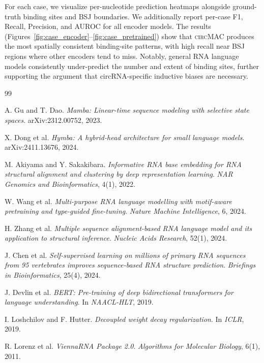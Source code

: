 \documentclass[11pt]{article}
\newcommand{\model}{\textsc{circMAC}}
\begin{document}
For each case, we visualize per-nucleotide prediction heatmaps alongside
ground-truth binding sites and BSJ boundaries.
We additionally report per-case F1, Recall, Precision, and AUROC for all
encoder models.
The results (Figures~\ref{fig:case_encoder}--\ref{fig:case_pretrained})
show that \model{} produces the most spatially consistent binding-site
patterns, with high recall near BSJ regions where other encoders tend to
miss.
Notably, general RNA language models consistently under-predict the number
and extent of binding sites, further supporting the argument that
circRNA-specific inductive biases are necessary.



\begin{thebibliography}{99}

A. Gu and T. Dao.
\textit{Mamba: Linear-time sequence modeling with selective state spaces}.
arXiv:2312.00752, 2023.

X. Dong et al.
\textit{Hymba: A hybrid-head architecture for small language models}.
arXiv:2411.13676, 2024.

M. Akiyama and Y. Sakakibara.
\textit{Informative RNA base embedding for RNA structural alignment and
clustering by deep representation learning}.
\textit{NAR Genomics and Bioinformatics}, 4(1), 2022.

W. Wang et al.
\textit{Multi-purpose RNA language modelling with motif-aware pretraining
and type-guided fine-tuning}.
\textit{Nature Machine Intelligence}, 6, 2024.

H. Zhang et al.
\textit{Multiple sequence alignment-based RNA language model and its
application to structural inference}.
\textit{Nucleic Acids Research}, 52(1), 2024.

J. Chen et al.
\textit{Self-supervised learning on millions of primary RNA sequences from
95 vertebrates improves sequence-based RNA structure prediction}.
\textit{Briefings in Bioinformatics}, 25(4), 2024.

J. Devlin et al.
\textit{BERT: Pre-training of deep bidirectional transformers for language
understanding}.
In \textit{NAACL-HLT}, 2019.

I. Loshchilov and F. Hutter.
\textit{Decoupled weight decay regularization}.
In \textit{ICLR}, 2019.

R. Lorenz et al.
\textit{ViennaRNA Package 2.0}.
\textit{Algorithms for Molecular Biology}, 6(1), 2011.

\end{thebibliography}
\end{document}
